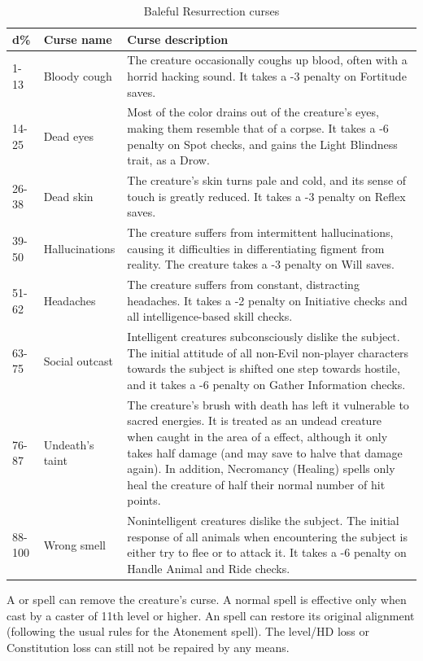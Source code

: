 \begin{table}
\label{tab:BalefulResurrection}
\caption{Baleful Resurrection curses}
\centering
\begin{tabular}{|p{}|p{}|p{}|}
\hline
d\%&  Curse name&  Curse description\\
\hline
1-13&Bloody cough& The creature occasionally coughs up blood, often with a horrid hacking sound. It takes a -3 penalty on Fortitude saves.\\
14-25&Dead eyes& Most of the color drains out of the creature's eyes, making them resemble that of a corpse. It takes a -6 penalty on Spot checks, and gains the Light Blindness trait, as a Drow.\\
26-38&Dead skin& The creature's skin turns pale and cold, and its sense of touch is greatly reduced. It takes a -3 penalty on Reflex saves.\\
39-50&Hallucinations& The creature suffers from intermittent hallucinations, causing it difficulties in differentiating figment from reality. The creature takes a -3 penalty on Will saves.\\
51-62&Headaches& The creature suffers from constant, distracting headaches. It takes a -2 penalty on Initiative checks and all intelligence-based skill checks.\\
63-75&Social outcast& Intelligent creatures subconsciously dislike the subject. The initial attitude of all non-Evil non-player characters towards the subject is shifted one step towards hostile, and it takes a -6 penalty on Gather Information checks.\\
76-87&Undeath's taint& The creature's brush with death has left it vulnerable to sacred energies. It is treated as an undead creature when caught in the area of a \nameref{Feat:TurnUndead} effect, although it only takes half damage (and may save to halve that damage again). In addition, Necromancy (Healing) spells only heal the creature of half their normal number of hit points.\\
88-100&Wrong smell& Nonintelligent creatures dislike the subject. The initial response of all animals when encountering the subject is either try to flee or to attack it. It takes a -6 penalty on Handle Animal and Ride checks.\\
\hline
\end{tabular}
\end{table}

A  or  spell can remove the creature's curse. A normal  spell is effective only when cast by a caster of 11th level or higher. An  spell can restore its original alignment (following the usual rules for the Atonement spell). The level/HD loss or Constitution loss can still not be repaired by any means.

